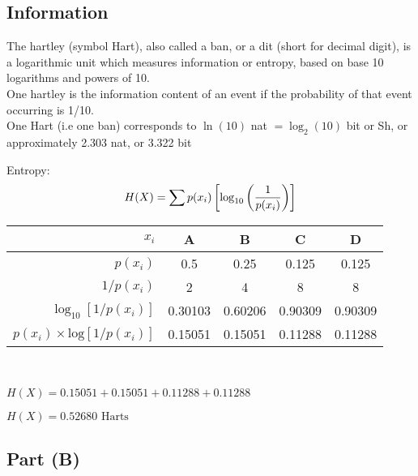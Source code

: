 \documentclass[a4paper,12pt]{article}
\begin{document}
\large 

\subsection*{Information}

\begin{framed}
\noindent The hartley (symbol Hart), also called a ban, or a dit (short for decimal digit), is a logarithmic unit which measures information or entropy, based on base 10 logarithms and powers of 10. \\
\noindent One hartley is the information content of an event if the probability of that event occurring is 1/10.\\
One Hart (i.e one ban) corresponds to $\ln(10)$ nat $= \log_2(10)$ bit or Sh, or approximately 2.303 nat, or 3.322 bit
\end{framed}

\noindent Entropy:
\[H(X) = \sum p(x_i) \left[\log_{10} \left({1 \over p(x_i)} \right)\right] \]  \bigskip 

{
\Large 
\begin{tabular}{|r||c|c|c|c|} \hline
$x_i$ & A & B & C & D \\ \hline \hline
$p(x_i)$ &0.5&0.25&0.125 &0.125 \\ \hline
$1/ p(x_i)$ &2&4&8 &8 \\ \hline
$\log_{10}[ 1/ p(x_i) ]$  &0.30103	 &0.60206 	  &0.90309&	0.90309 \\ \hline
$p(x_i) \times \mbox{log}[1/ p(x_i)]$ & 0.15051 &	0.15051&	0.11288 &	0.11288 \\ \hline
\end{tabular}
}
\\  \bigskip

$H(X) = 0.15051 +	0.15051+	0.11288 +	0.11288 $ \bigskip

$H(X) =  0.52680 \mbox{ Harts}$



\newpage 

\subsection*{Part (B)}
\end{document}
